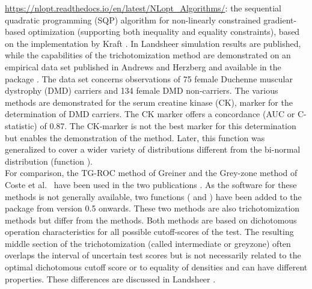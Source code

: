 \documentclass[
  nojss]{jss}
\begin{document}
\url{https://nlopt.readthedocs.io/en/latest/NLopt_Algorithms/}: the
sequential quadratic programming (SQP) algorithm for non-linearly
constrained gradient-based optimization (supporting both inequality and
equality constraints), based on the implementation by Kraft
\citetext{\citeyear{kraft_software_1988}; \citeyear{kraft_algorithm_1994}}.
In Landsheer \citeyearpar{landsheer_clinical_2018} simulation results
are published, while the capabilities of the trichotomization method are
demonstrated on an empirical data set published in Andrews and Herzberg
\citeyearpar{andrews_data:_1985} and available in the 
package  \citep{peters_cran_2015}. The data set concerns
observations of 75 female Duchenne muscular dystrophy (DMD) carriers and
134 female DMD non-carriers. The various methods are demonstrated for
the serum creatine kinase (CK), marker for the determination of DMD
carriers. The CK marker offers a concordance (AUC or C-statistic) of
0.87. The CK-marker is not the best marker for this determination but
enables the demonstration of the  method. Later, this
function was generalized to cover a wider variety of distributions
different from the bi-normal distribution (function
).\\
For comparison, the TG-ROC method of Greiner
\citetext{\citeyear{greiner_two-graph_1995}; \citeyear{greiner_two-graph_1996}}
and the Grey-zone method of Coste et
al.~\citetext{\citeyear{coste_gray_2006}; \citeyear{coste_grey_2003}}
have been used in the two publications
\citep{landsheer_interval_2016, landsheer_clinical_2018}. As the
software for these methods is not generally available, two functions
( and ) have been added to the
 package from version 0.5 onwards. These two
methods are also trichotomization methods but differ from the
 methods. Both methods are based on dichotomous
operation characteristics for all possible cutoff-scores of the test.
The resulting middle section of the trichotomization (called
intermediate or greyzone) often overlaps the interval of uncertain test
scores but is not necessarily related to the optimal dichotomous cutoff
score or to equality of densities and can have different properties.
These differences are discussed in Landsheer
\citeyearpar{landsheer_clinical_2018}.
\end{document}
